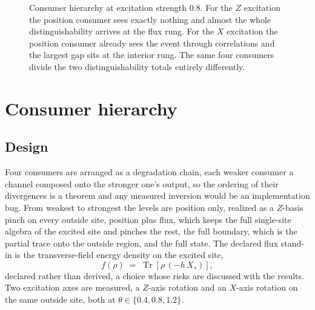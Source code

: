 \documentclass[aps,prd,reprint,nofootinbib,longbibliography]{revtex4-2}
\newcommand{\Tr}{\operatorname{Tr}}
\begin{document}
\begin{figure}[t]
\centering
{}
\caption{Consumer hierarchy at excitation strength $0.8$.  For the $Z$
excitation the position consumer sees exactly nothing and almost the whole
distinguishability arrives at the flux rung.  For the $X$ excitation the
position consumer already sees the event through correlations and the
largest gap sits at the interior rung.  The same four consumers divide the
two distinguishability totals entirely differently.}
\label{fig:hierarchy}
\end{figure}

\section{Consumer hierarchy}
\label{sec:hierarchy}

\subsection{Design}

Four consumers are arranged as a degradation chain, each weaker consumer a
channel composed onto the stronger one's output, so the ordering of their
divergences is a theorem and any measured inversion would be an
implementation bug.  From weakest to strongest the levels are position
only, realized as a $Z$-basis pinch on every outside site, position plus
flux, which keeps the full single-site algebra of the excited site and
pinches the rest, the full boundary, which is the partial trace onto the
outside region, and the full state.  The declared flux stand-in is the
transverse-field energy density on the excited site,
\begin{equation}
f(\rho) \;=\; \Tr\!\left[\rho\,(-h\,X_{s})\right],
\label{eq:flux}
\end{equation}
declared rather than derived, a choice whose risks are discussed with the
results.  Two excitation axes are measured, a $Z$-axis rotation and an
$X$-axis rotation on the same outside site, both at
$\theta\in\{0.4,0.8,1.2\}$.
\end{document}
